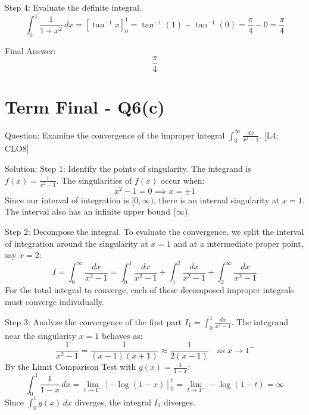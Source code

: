 \documentclass[11pt, a4paper]{article}
\begin{document}
Step 4: Evaluate the definite integral.
\[
\int_{0}^{1} \frac{1}{1 + x^2} \, dx = \left[ \tan^{-1} x \right]_{0}^{1} = \tan^{-1}(1) - \tan^{-1}(0) = \frac{\pi}{4} - 0 = \frac{\pi}{4}
\]

Final Answer:
\[
\boxed{\frac{\pi}{4}}
\]





\section*{Term Final - Q6(c)}

Question:
Examine the convergence of the improper integral $\int_{0}^{\infty} \frac{dx}{x^2 - 1}$. [L4; CLO8]

Solution:
Step 1: Identify the points of singularity.
The integrand is $f(x) = \frac{1}{x^2 - 1}$. The singularities of $f(x)$ occur when:
\[
x^2 - 1 = 0 \implies x = \pm 1
\]
Since our interval of integration is $[0, \infty)$, there is an internal singularity at $x = 1$. The interval also has an infinite upper bound ($\infty$).

Step 2: Decompose the integral.
To evaluate the convergence, we split the interval of integration around the singularity at $x = 1$ and at a intermediate proper point, say $x = 2$:
\[
I = \int_{0}^{\infty} \frac{dx}{x^2 - 1} = \int_{0}^{1} \frac{dx}{x^2 - 1} + \int_{1}^{2} \frac{dx}{x^2 - 1} + \int_{2}^{\infty} \frac{dx}{x^2 - 1}
\]
For the total integral to converge, each of these decomposed improper integrals must converge individually.

Step 3: Analyze the convergence of the first part $I_1 = \int_{0}^{1} \frac{dx}{x^2 - 1}$.
The integrand near the singularity $x = 1$ behaves as:
\[
\frac{1}{x^2 - 1} = \frac{1}{(x-1)(x+1)} \approx \frac{1}{2(x-1)} \quad \text{as } x \to 1^{-}
\]
By the Limit Comparison Test with $g(x) = \frac{1}{1-x}$:
\[
\int_{0}^{1} \frac{1}{1-x} \, dx = \lim_{t \to 1^{-}} \left[ -\log(1-x) \right]_{0}^{t} = \lim_{t \to 1^{-}} -\log(1-t) = \infty
\]
Since $\int_{0}^{1} g(x) \, dx$ diverges, the integral $I_1$ diverges.
\end{document}
